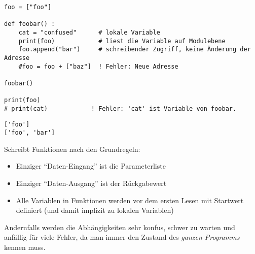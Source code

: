 
\begin{frame}[fragile]
%
\begin{codebox}
\begin{verbatim}
foo = ["foo"]

def foobar() :
    cat = "confused"      # lokale Variable
    print(foo)            # liest die Variable auf Modulebene
    foo.append("bar")     # schreibender Zugriff, keine Änderung der Adresse
    #foo = foo + ["baz"]  ! Fehler: Neue Adresse

foobar()

print(foo)
# print(cat)            ! Fehler: 'cat' ist Variable von foobar.
\end{verbatim}
\end{codebox}
\begin{cmdbox}
\begin{verbatim}
['foo']
['foo', 'bar']
\end{verbatim}
\end{cmdbox}
%
\end{frame}


\begin{frame}
%
\begin{hintbox}
Schreibt Funktionen nach den Grundregeln:
\begin{itemize}
\item Einziger \enquote{Daten-Eingang} ist die Parameterliste
\item Einziger \enquote{Daten-Ausgang} ist der Rückgabewert
\item Alle Variablen in Funktionen werden vor dem ersten Lesen mit Startwert definiert (und damit implizit zu lokalen Variablen)
\end{itemize}
Andernfalls werden die Abhängigkeiten sehr konfus, schwer zu warten und anfällig für viele Fehler, da man immer den Zustand des \emph{ganzen Programms} kennen muss.
\end{hintbox}
%
\end{frame}